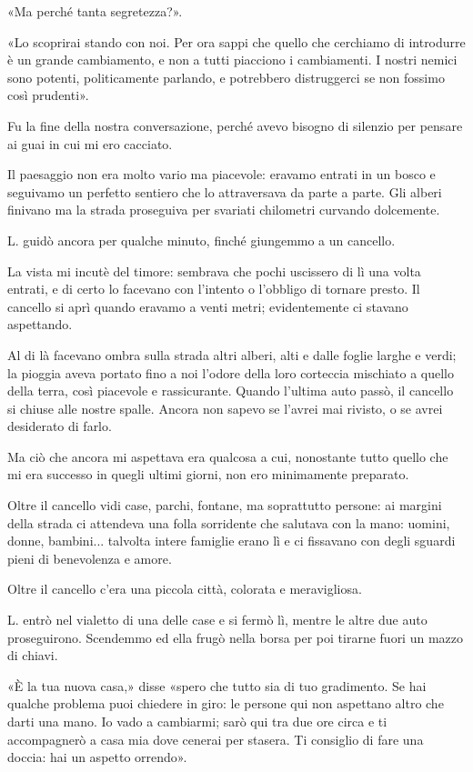 \documentclass[a4paper,12pt]{book}
\begin{document}
«Ma perché tanta segretezza?».

«Lo scoprirai stando con noi. Per ora sappi che quello che cerchiamo di
introdurre è un grande cambiamento, e non a tutti piacciono i cambiamenti. I
nostri nemici sono potenti, politicamente parlando, e potrebbero distruggerci se
non fossimo così prudenti».

Fu la fine della nostra conversazione, perché avevo bisogno di silenzio per
pensare ai guai in cui mi ero cacciato.

Il paesaggio non era molto vario ma piacevole: eravamo entrati in un bosco e
seguivamo un perfetto sentiero che lo attraversava da parte a parte. Gli alberi
finivano ma la strada proseguiva per svariati chilometri curvando dolcemente.

L. guidò ancora per qualche minuto, finché giungemmo a un cancello.

La vista mi incutè del timore: sembrava che pochi uscissero di lì una volta
entrati, e di certo lo facevano con l'intento o l'obbligo di tornare presto. Il
cancello si aprì quando eravamo a venti metri; evidentemente ci stavano
aspettando.

Al di là facevano ombra sulla strada altri alberi, alti e dalle foglie larghe e
verdi; la pioggia aveva portato fino a noi l'odore della loro corteccia
mischiato a quello della terra, così piacevole e rassicurante. Quando l'ultima
auto passò, il cancello si chiuse alle nostre spalle. Ancora non sapevo se
l'avrei mai rivisto, o se avrei desiderato di farlo.

Ma ciò che ancora mi aspettava era qualcosa a cui, nonostante tutto quello che
mi era successo in quegli ultimi giorni, non ero minimamente preparato.

Oltre il cancello vidi case, parchi, fontane, ma soprattutto persone: ai margini
della strada ci attendeva una folla sorridente che salutava con la mano: uomini,
donne, bambini... talvolta intere famiglie erano lì e ci fissavano con degli
sguardi pieni di benevolenza e amore.

Oltre il cancello c'era una piccola città, colorata e meravigliosa.

L. entrò nel vialetto di una delle case e si fermò lì, mentre le altre due
auto proseguirono. Scendemmo ed ella frugò nella borsa per poi tirarne fuori un
mazzo di chiavi.

«È la tua nuova casa,» disse «spero che tutto sia di tuo gradimento. Se hai
qualche problema puoi chiedere in giro: le persone qui non aspettano altro che
darti una mano. Io vado a cambiarmi; sarò qui tra due ore circa e ti
accompagnerò a casa mia dove cenerai per stasera. Ti consiglio di fare una
doccia: hai un aspetto orrendo».
\end{document}
